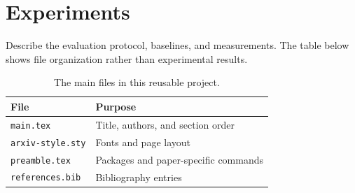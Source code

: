 \section{Experiments}
\label{sec:experiments}

Describe the evaluation protocol, baselines, and measurements. The table below
shows file organization rather than experimental results.

\begin{table}[htbp]
    \centering
    \caption{The main files in this reusable project.}
    \label{tab:files}
    \begin{tabularx}{\linewidth}{@{}lX@{}}
        \toprule
        File & Purpose \\
        \midrule
        \texttt{main.tex} & Title, authors, and section order \\
        \texttt{arxiv-style.sty} & Fonts and page layout \\
        \texttt{preamble.tex} & Packages and paper-specific commands \\
        \texttt{references.bib} & Bibliography entries \\
        \bottomrule
    \end{tabularx}
\end{table}


